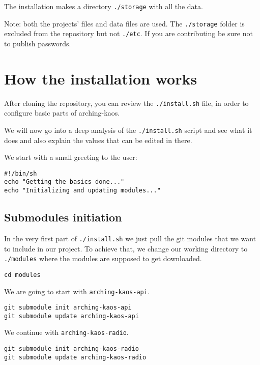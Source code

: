\documentclass[12pt]{report}
\begin{document}
The installation makes a directory \texttt{./storage} with all the data.

Note: both the projects' files and data files are used. The
\texttt{./storage} folder is excluded from the repository but not
\texttt{./etc}. If you are contributing be sure not to publish
passwords.


\section{How the installation
works}\label{how-the-installation-works}

After cloning the repository, you can review the \texttt{./install.sh}
file, in order to configure basic parts of arching-kaos.

We will now go into a deep analysis of the \texttt{./install.sh} script
and see what it does and also explain the values that can be edited in
there.

We start with a small greeting to the user:

\begin{verbatim}
#!/bin/sh
echo "Getting the basics done..."
echo "Initializing and updating modules..."
\end{verbatim}


\subsection{Submodules initiation}\label{submodules-initiation}

In the very first part of \texttt{./install.sh} we just pull the git
modules that we want to include in our project. To achieve that, we
change our working directory to \texttt{./modules} where the modules are
supposed to get downloaded.

\begin{verbatim}
cd modules
\end{verbatim}

We are going to start with \texttt{arching-kaos-api}.

\begin{verbatim}
git submodule init arching-kaos-api
git submodule update arching-kaos-api
\end{verbatim}

We continue with \texttt{arching-kaos-radio}.

\begin{verbatim}
git submodule init arching-kaos-radio
git submodule update arching-kaos-radio
\end{verbatim}
\end{document}
